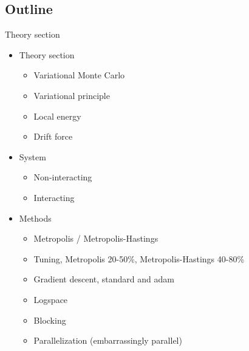 


\subsection{Outline}


Theory section 

\begin{itemize}
    \item Theory section
    \begin{itemize}
        \item Variational Monte Carlo
        \item Variational principle
        \item Local energy
        \item Drift force
    \end{itemize}
    \item System
    \begin{itemize}
        \item Non-interacting
        \item Interacting
    \end{itemize}
    \item Methods
    \begin{itemize}
        \item Metropolis / Metropolis-Hastings
        \item Tuning, Metropolis 20-50\%, Metropolis-Hastings 40-80\% 
        \item Gradient descent, standard and adam 
        \item Logspace
        \item Blocking
        \item Parallelization (embarrassingly parallel) 
    \end{itemize}
\end{itemize}

